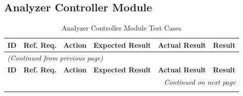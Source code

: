 \documentclass[12pt, titlepage]{article}
\begin{document}
\subsection{Analyzer Controller Module}

\begin{longtable}{c 
  >{\raggedright\arraybackslash}p{1.5cm} 
  >{\raggedright\arraybackslash}p{4.5cm} 
  >{\raggedright\arraybackslash}p{4cm} 
  >{\raggedright\arraybackslash}p{3cm} c}
  \toprule
  \textbf{ID} & \textbf{Ref. Req.} & \textbf{Action} & \textbf{Expected Result} & \textbf{Actual Result} & \textbf{Result} \\ 
  \midrule
  \endfirsthead

  \multicolumn{6}{l}{\textit{(Continued from previous page)}} \\ 
  \toprule
  \textbf{ID} & \textbf{Ref. Req.} & \textbf{Action} & \textbf{Expected Result} & \textbf{Actual Result} & \textbf{Result} \\ 
  \midrule
  \endhead

  \multicolumn{6}{r}{\textit{Continued on next page}} \\
  \endfoot

  \bottomrule
  \caption{Analyzer Controller Module Test Cases}
  \label{table:analyzer_controller_tests}
  \endlastfoot


\end{longtable}
\end{document}
